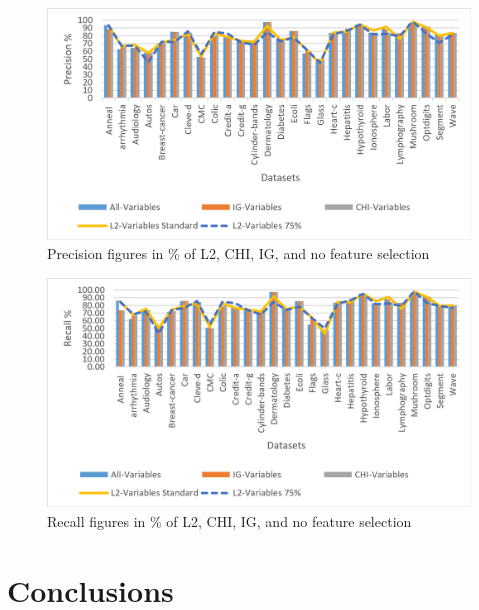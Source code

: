 \documentclass[review]{elsarticle}
\begin{document}
\begin{figure}[h]
	\centering
	\includegraphics[width=0.8\linewidth]{figs/fig_6a_precision_75.png}
	\caption[fig-6a-precision-75]{Precision figures in \% of L2, CHI, IG, and no feature selection  }
	\label{fig:fig-6a-precision-75}
\end{figure}


\begin{figure}[h]
	\centering
	\includegraphics[width=0.8\linewidth]{figs/fig_6b_recall_75.png}
	\caption[fig-6b-recall-75]{Recall figures in \% of L2, CHI, IG, and no feature selection  }
	\label{fig:fig-6b-recall-75}
\end{figure}


\section{Conclusions }
\end{document}
